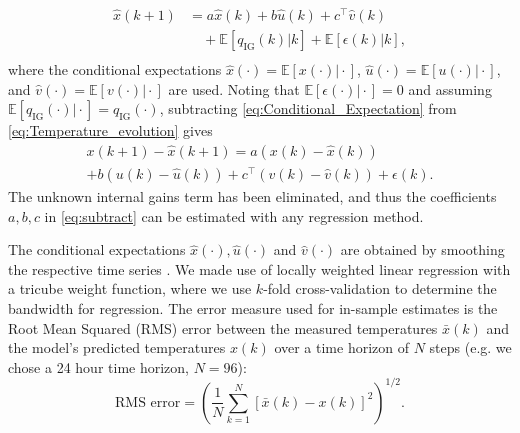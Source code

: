 \begin{equation}\label{eq:Conditional_Expectation}
\begin{aligned}
\hat{x}(k+1) &= a\hat{x}(k) + b\hat{u}(k) + c^\top\hat{v}(k) \\
& \quad + \mathbb{E}\left[ q_{\text{IG}}(k) \vert k \right] + \mathbb{E}\left[ \epsilon(k) \vert k \right],\\
\end{aligned}
\end{equation}
\noindent
where the conditional expectations $\hat{x}(\cdot) = \mathbb{E}\left[ x(\cdot) \vert \cdot \right]$, $\hat{u}(\cdot) = \mathbb{E}\left[ u(\cdot) \vert \cdot \right]$, and $\hat{v}(\cdot) = \mathbb{E}\left[ v(\cdot) \vert \cdot \right]$ are used.
Noting that $\mathbb{E}\left[ \epsilon(\cdot) \vert \cdot \right] = 0$ and assuming $\mathbb{E}\left[ q_{\text{IG}}(\cdot) \vert \cdot \right] = q_{\text{IG}}(\cdot)$, subtracting \eqref{eq:Conditional_Expectation} from \eqref{eq:Temperature_evolution} gives
\begin{equation}\label{eq:subtract}
\begin{split}
x(k+1) - \hat{x}(k+1) = a\left( x(k) - \hat{x}(k) \right) \\ + b\left( u(k) - \hat{u}(k) \right)
+ c^\top \left( v(k) - \hat{v}(k) \right) + \epsilon(k).
\end{split}
\end{equation}
The unknown internal gains term has been eliminated, and thus the coefficients $a, b, c$ in \eqref{eq:subtract} can be estimated with any regression method.

The conditional expectations $\hat{x}(\cdot), \hat{u}(\cdot)$ and $\hat{v}(\cdot)$ are obtained by smoothing the respective time series \cite{Aswani:2012aa}. We made use of locally weighted linear regression with a tricube weight function, where we use $k$-fold cross-validation to determine the bandwidth for regression.
The error measure used for in-sample estimates is the Root Mean Squared (RMS) error between the measured temperatures $\bar{x}(k)$ and the model's predicted temperatures $x(k)$ over a time horizon of $N$ steps (e.g. we chose a 24 hour time horizon, $N = 96$):
\begin{equation}\label{eq:RMS}
\text{RMS error} = \left(\frac{1}{N}\textstyle\sum_{k=1}^N \left[\bar{x}(k) - x(k)\right]^2 \right)^{1/2}.
\end{equation}
